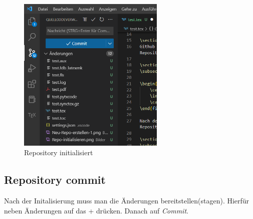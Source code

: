 \documentclass[12pt]{scrartcl}
\begin{document}
\begin{figure}[ht]
    \centering
    \includegraphics[width=7cm]{Repo-initalisiert.png}
    \caption[fig:repoinit2]{Repository initialisiert}
\end{figure}

\subsection{Repository commit}
Nach der Initalisierung muss man die Änderungen bereitstellen(stagen). Hierfür neben Änderungen auf das + drücken. Danach auf \textit{Commit}.

 

 

 
\end{document}
